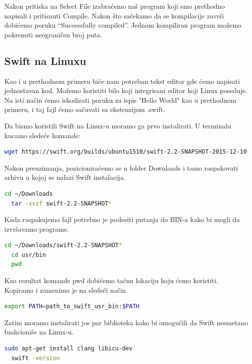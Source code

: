 \documentclass[a4paper]{article}
\begin{document}
Nakon pritiska na Select File izabraćemo naš program koji smo prethodno napisali i pritisnuti Compile. Nakon što sačekamo da se kompilacije završi dobićemo poruku “Successfully compiled”.
Jednom kompiliran program možemo pokrenuti neograničen broj puta.

\subsection{Swift na Linuxu}
\label{subsec:podnaslovLinux}

Kao i u prethodnom primeru biće nam potreban tekst editor gde ćemo napisati jednostavan kod.
Možemo koristiti bilo koji integrisani editor koji Linux poseduje. Na isti način ćemo iskodirati poruku za ispis "Hello World" kao u prethodnom primeru, i taj fajl ćemo sačuvati sa ekstenzijom .swift.

Da bismo koristili Swift na Linux-u moramo ga prvo instalirati. U terminalu kucamo sledeće komande:

\begin{lstlisting}[language=bash]
	wget https://swift.org/builds/ubuntu1510/swift-2.2-SNAPSHOT-2015-12-10-a/swift-2.2-SNAPSHOT-2015-12-10-a-ubuntu15.10.tar.gz

\end{lstlisting}
Nakon preuzimanja, pozicioniraćemo se u folder Downloads i tamo raspakovati arhivu u kojoj se nalazi Swift instalacija.

\begin{lstlisting}[language=bash]
  cd ~/Downloads
  tar -xvzf swift-2.2-SNAPSHOT*
\end{lstlisting}

Kada raspakujemo fajl potrebno je podesiti putanja do BIN-a kako bi mogli da izvršavamo programe.

\begin{lstlisting}[language=bash]
  cd ~/Downloads/swift-2.2-SNAPSHOT*
  cd usr/bin
  pwd
\end{lstlisting}

Kao rezultat komande pwd dobićemo tačnu lokaciju koju ćemo koristiti. Kopiramo i zamenimo je na sledeći način.
\begin{lstlisting}[language=bash]
  export PATH=path_to_swift_usr_bin:$PATH

\end{lstlisting}

Zatim moramo instalirati jos par biblioteka kako bi omogućili da Swift nesmetano funkcioniše na Linux-u.

\begin{lstlisting}[language=bash]
  sudo apt-get install clang libicu-dev
  swift -version
\end{lstlisting}
\end{document}
